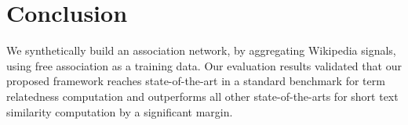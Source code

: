 \section{Conclusion}
\label{sec:conclude}


We synthetically
build an association network, by aggregating Wikipedia
signals, using free association as a training data. 
 Our evaluation results
validated that our proposed framework reaches state-of-the-art
in a standard benchmark for term relatedness computation and
outperforms all other state-of-the-arts for short text similarity
computation by a significant margin.
